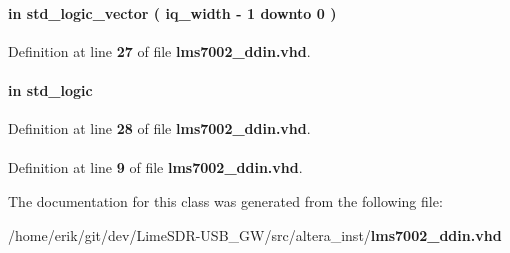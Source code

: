 \paragraph[{rxiq}]{ {\bfseries \textcolor{keywordflow}{in}\textcolor{vhdlchar}{ }} {\bfseries \textcolor{comment}{std\+\_\+logic\+\_\+vector}\textcolor{vhdlchar}{ }\textcolor{vhdlchar}{(}\textcolor{vhdlchar}{ }\textcolor{vhdlchar}{ }\textcolor{vhdlchar}{ }\textcolor{vhdlchar}{ }{\bfseries {\bf iq\+\_\+width}} \textcolor{vhdlchar}{-\/}\textcolor{vhdlchar}{ } \textcolor{vhdldigit}{1} \textcolor{vhdlchar}{ }\textcolor{keywordflow}{downto}\textcolor{vhdlchar}{ }\textcolor{vhdlchar}{ } \textcolor{vhdldigit}{0} \textcolor{vhdlchar}{ }\textcolor{vhdlchar}{)}\textcolor{vhdlchar}{ }} \hspace{0.3cm}{\ttfamily [Port]}}\label{classlms7002__ddin_ac0b4b32dc020b9b848a6c8ed49ee0dac}


Definition at line {\bf 27} of file {\bf lms7002\+\_\+ddin.\+vhd}.

\paragraph[{rxiqsel}]{ {\bfseries \textcolor{keywordflow}{in}\textcolor{vhdlchar}{ }} {\bfseries \textcolor{comment}{std\+\_\+logic}\textcolor{vhdlchar}{ }} \hspace{0.3cm}{\ttfamily [Port]}}\label{classlms7002__ddin_a5f8c9b4907f6c220852b7ecbeba0f725}


Definition at line {\bf 28} of file {\bf lms7002\+\_\+ddin.\+vhd}.

\paragraph[{std\+\_\+logic\+\_\+1164}]{\hspace{0.3cm}{\ttfamily [Package]}}\label{classlms7002__ddin_acd03516902501cd1c7296a98e22c6fcb}


Definition at line {\bf 9} of file {\bf lms7002\+\_\+ddin.\+vhd}.



The documentation for this class was generated from the following file\+:\begin{DoxyCompactItemize}
\item 
/home/erik/git/dev/\+Lime\+S\+D\+R-\/\+U\+S\+B\+\_\+\+G\+W/src/altera\+\_\+inst/{\bf lms7002\+\_\+ddin.\+vhd}\end{DoxyCompactItemize}
